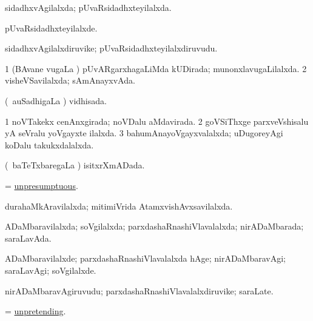 \bentry
{} 
\gl{\gu}
\expl{}
\bmng
sidadhxvAgilalxda; pUvaRsidadhxteyilalxda. 
\emng
\eentry

\bentry
{} 
\gl{\kirxvi}
\expl{}
\bmng
pUvaRsidadhxteyilalxde. 
\emng
\eentry

\bentry
{} 
\gl{\nA}
\expl{}
\bmng
sidadhxvAgilalxdiruvike; pUvaRsidadhxteyilalxdiruvudu. 
\emng
\eentry

\bentry
{} 
\gl{\gu}
\expl{}
\bmng
\bnum
\num{1} (BAvane \mo vugaLa \vi) pUvARgarxhagaLiMda kUDirada; munonxlavugaLilalxda. 
\num{2} visheVSavilalxda; sAmAnayxvAda. 
\enum
\emng
\eentry

\bentry
{} 
\gl{\gu}
\expl{}
\bmng
(\kanmu\ auSadhigaLa \vi) vidhisada. 
\emng
\eentry

\bentry
{} 
\gl{\gu}
\expl{}
\bmng
\bnum
\num{1} noVTakekx cenAnxgirada; noVDalu aMdavirada. 
\num{2} goVSiThxge parxveVshisalu yA seVralu yoVgayxte ilalxda. 
\num{3} bahumAnayoVgayxvalalxda; uDugoreyAgi koDalu takukxdalalxda. 
\enum
\emng
\eentry

\bentry
{} 
\gl{\gu}
\expl{}
\bmng
(\kanmu\ baTeTxbaregaLa \vi) isitxrXmADada. 
\emng
\eentry

\bentry
{} 
\gl{\gu}
\expl{}
\bmng
= \hyperlink{unpresumptuous}{unpresumptuous}. 
\emng
\eentry

\bentry
{} 
\gl{\gu}
\expl{}
\bmng
durahaMkAravilalxda; mitimiVrida AtamxvishAvxsavilalxda. 
\emng
\eentry

\bentry
{} 
\gl{\gu}
\expl{}
\bmng
ADaMbaravilalxda; soVgilalxda; parxdashaRnashiVlavalalxda; nirADaMbarada; saraLavAda. 
\emng
\eentry

\bentry
{} 
\gl{\kirxvi}
\expl{}
\bmng
ADaMbaravilalxde; parxdashaRnashiVlavalalxda hAge; nirADaMbaravAgi; saraLavAgi; soVgilalxde. 
\emng
\eentry

\bentry
{} 
\gl{\nA}
\expl{}
\bmng
nirADaMbaravAgiruvudu; parxdashaRnashiVlavalalxdiruvike; saraLate. 
\emng
\eentry

\bentry
{} 
\gl{\gu}
\expl{}
\bmng
= \hyperlink{unpretending}{unpretending}. 
\emng
\eentry

